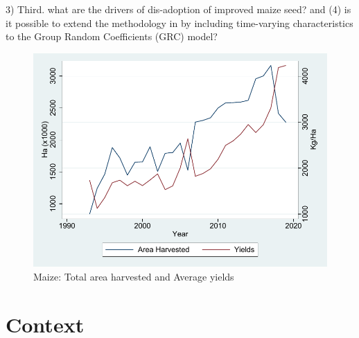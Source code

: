 \documentclass{article}
\begin{document}
3) Third. what are the drivers of dis-adoption of improved maize seed? and (4) is it possible to extend the methodology in \citep{Tjernstrom_Emilia_Dalia_Ghanem_Oscar_Barriga_Cabanillas_Travis_J_Lybbert_Jeffrey_D_Michler_and_Aleksandr_Michuda2020-bc} by including time-varying characteristics to the Group Random Coefficients (GRC) model?






\begin{figure}[H]
    \centering
    \includegraphics{results/figures/Maize_yields.pdf}
    \caption{Maize: Total area harvested and Average yields}
    \label{fig:maize_yields}
\end{figure}


\section{Context}
\end{document}
